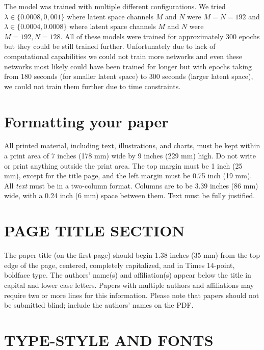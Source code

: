 \documentclass{article}
\begin{document}
The model was trained with multiple different configurations. We tried $\lambda \in \{0.0008, 0,001\}$ where latent space channels $M$ and $N$ were $M=N=192$ and $\lambda \in \{0.0004, 0.0008\}$ where latent space channels $M$ and $N$ were $M=192, N=128$.
All of these models were trained for approximately 300 epochs but they could be still trained further.
Unfortunately due to lack of computational capabilities we could not train more networks and even these networks most likely could have been trained for longer but with epochs taking from 180 seconds (for smaller latent space) to 300 seconds (larger latent space), we could not train them further due to time constraints.



\vfill\pagebreak
\vfill\pagebreak

\section{Formatting your paper}
\label{sec:format}

All printed material, including text, illustrations, and charts, must be kept
within a print area of 7 inches (178 mm) wide by 9 inches (229 mm) high. Do
not write or print anything outside the print area. The top margin must be 1
inch (25 mm), except for the title page, and the left margin must be 0.75 inch
(19 mm).  All {\it text} must be in a two-column format. Columns are to be 3.39
inches (86 mm) wide, with a 0.24 inch (6 mm) space between them. Text must be
fully justified.

\section{PAGE TITLE SECTION}
\label{sec:pagestyle}

The paper title (on the first page) should begin 1.38 inches (35 mm) from the
top edge of the page, centered, completely capitalized, and in Times 14-point,
boldface type.  The authors' name(s) and affiliation(s) appear below the title
in capital and lower case letters.  Papers with multiple authors and
affiliations may require two or more lines for this information. Please note
that papers should not be submitted blind; include the authors' names on the
PDF.

\section{TYPE-STYLE AND FONTS}
\label{sec:typestyle}
\end{document}
